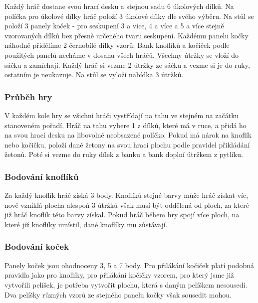 Každý hráč dostane svou hrací desku a stejnou sadu 6 úkolových dílků. Na políčka pro úkolové dílky hráč položí 3 úkolové dílky dle svého výběru. 
Na stůl se položí 3 panely koček - pro seskupení 3 a více, 4 a více a 5 a více stejně vzorovaných dílků bez přesně určeného tvaru seskupení. Každému panelu kočky náhodně přidělíme 2 černobílé dílky vzorů. 
Bank knoflíků a kočiček podle použitých panelů necháme v dosahu všech hráčů. 
Všechny útržky se vloží do sáčku a zamíchají. Každý hráč si vezme 2 útržky ze sáčku a vezme si je do ruky, ostatním je neukazuje. Na stůl se vyloží nabídka 3 útržků.

\subsubsection*{Průběh hry}

V každém kole hry se všichni hráči vystřídají na tahu ve stejném na začátku stanoveném pořadí. Hráč na tahu vybere 1 z dílků, které má v ruce, a přidá ho na svou hrací desku na libovolné neobsazené políčko. Pokud má nárok na knoflík nebo kočičku, položí dané žetony na svou hrací plochu podle pravidel přikládání žetonů. Poté si vezme do ruky dílek z banku a bank doplní útržkem z pytlíku.

\subsubsection*{Bodování knoflíků}
Za každý knoflík hráč získá 3 body. Knoflíků stejné barvy může hráč získat víc, nově vzniklá plocha alespoň 3 útržků však musí být oddělená od ploch, za které již hráč knoflík této barvy získal. Pokud hráč během hry spojí více ploch, na které již knoflíky umístil, dané knoflíky mu zůstávají.

\subsubsection*{Bodování koček}
Panely koček jsou ohodnoceny 3, 5 a 7 body.
Pro přilákání kočiček platí podobná pravidla jako pro knoflíky, pro přilákání kočičky vzorem, pro který jsme již vytvořili pelíšek, je potřeba vytvořit plochu, která s daným pelíškem nesousedí. Dva pelíšky různých vzorů ze stejného panelu kočky však sousedit mohou. 


